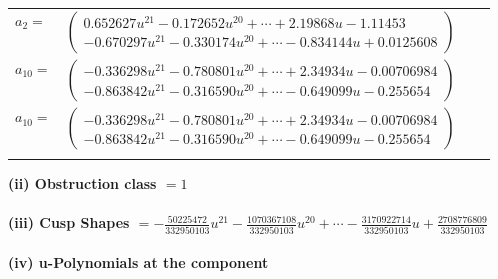 \documentclass[1p]{elsarticle_modified}
\theoremstyle{definition}
\begin{document}
\begin{tabular}{m{7pt} m{180pt} m{7pt} m{180pt} }
\flushright $a_{2}=$&$\begin{pmatrix}0.652627 u^{21}-0.172652 u^{20}+\cdots+2.19868 u-1.11453\\-0.670297 u^{21}-0.330174 u^{20}+\cdots-0.834144 u+0.0125608\end{pmatrix}$ \\
\flushright $a_{10}=$&$\begin{pmatrix}-0.336298 u^{21}-0.780801 u^{20}+\cdots+2.34934 u-0.00706984\\-0.863842 u^{21}-0.316590 u^{20}+\cdots-0.649099 u-0.255654\end{pmatrix}$\\ \flushright $a_{10}=$&$\begin{pmatrix}-0.336298 u^{21}-0.780801 u^{20}+\cdots+2.34934 u-0.00706984\\-0.863842 u^{21}-0.316590 u^{20}+\cdots-0.649099 u-0.255654\end{pmatrix}$\\&\end{tabular}
\flushleft \textbf{(ii) Obstruction class $= 1$}\\~\\
\flushleft \textbf{(iii) Cusp Shapes $= -\frac{50225472}{332950103} u^{21}-\frac{1070367108}{332950103} u^{20}+\cdots-\frac{3170922714}{332950103} u+\frac{2708776809}{332950103}$}\\~\\
\newpage\renewcommand{\arraystretch}{1}
\flushleft \textbf{(iv) u-Polynomials at the component}\newline \\
\end{document}
